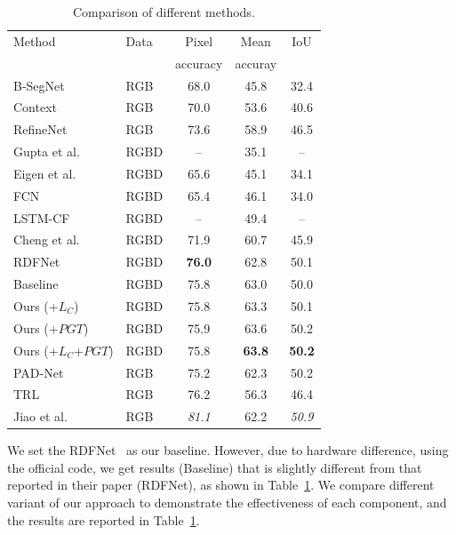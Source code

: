 \begin{table}[tb]
	\centering
	\caption{Comparison of different methods.}
	\begin{tabular*}{8.7cm}{llccc}
		\hline
		Method & Data & Pixel & Mean  & IoU\\
		       &     & accuracy & accuray  & \\
		\hline 
		B-SegNet \cite{Kendall2015} & RGB &68.0 & 45.8 & 32.4 \\
		Context \cite{Lin2016} & RGB & 70.0 & 53.6 & 40.6 \\
		RefineNet \cite{Lin2017} & RGB & 73.6 & 58.9 & 46.5\\
		\hline
		Gupta et al. \cite{Gupta2014} & RGBD & -- & 35.1 &--\\
		Eigen et al. \cite{Eigen2015} & RGBD & 65.6 & 45.1 & 34.1\\
		FCN \cite{Long2015} & RGBD & 65.4 & 46.1 & 34.0 \\
		LSTM-CF \cite{Li2016} & RGBD & --& 49.4 & -- \\
		Cheng et al.\cite{Cheng2017} & RGBD & 71.9 & 60.7 & 45.9 \\
		RDFNet \cite{Park2017} & RGBD & \bf{76.0} & 62.8 & 50.1\\	
		Baseline &RGBD & 75.8 & 63.0 & 50.0\\
		Ours (+$L_{C}$) & RGBD & 75.8 & 63.3 & 50.1\\
		Ours (+$PGT$) & RGBD & 75.9 & 63.6 & 50.2\\
		Ours (+$L_{C}$+$PGT$)& RGBD & 75.8 & \bf{63.8} & \bf{50.2}\\
		\hline
		PAD-Net \cite{Xu2018} & RGB &75.2 & 62.3 & 50.2\\
		TRL \cite{Zhang2018} & RGB &76.2 & 56.3 & 46.4\\
		Jiao et al.\cite{Jiao2018} & RGB & \emph{81.1} & 62.2 & \emph{50.9}\\
		\hline		 		
	\end{tabular*}
	\label{Tab:Results}
\end{table}



We set the RDFNet~\cite{Park2017} as our baseline. 
However, due to hardware difference, using the official code, we get results (Baseline) that is slightly different from that reported in their paper (RDFNet), as shown in Table~\ref{Tab:Results}. 
We compare different variant of our approach to demonstrate the effectiveness of each component, and the results are reported in Table~\ref{Tab:Results}. 

